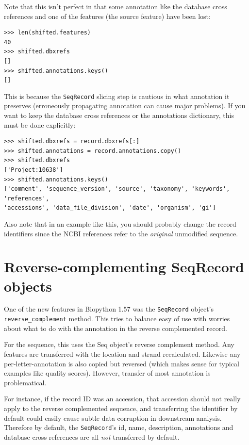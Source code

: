 \documentclass{report}
\begin{document}
Note that this isn't perfect in that some annotation like the database cross references
and one of the features (the source feature) have been lost:

\begin{verbatim}
>>> len(shifted.features)
40
>>> shifted.dbxrefs
[]
>>> shifted.annotations.keys()
[]
\end{verbatim}

This is because the \verb|SeqRecord| slicing step is cautious in what annotation
it preserves (erroneously propagating annotation can cause major problems). If
you want to keep the database cross references or the annotations dictionary,
this must be done explicitly:

\begin{verbatim}
>>> shifted.dbxrefs = record.dbxrefs[:]
>>> shifted.annotations = record.annotations.copy()
>>> shifted.dbxrefs
['Project:10638']
>>> shifted.annotations.keys()
['comment', 'sequence_version', 'source', 'taxonomy', 'keywords', 'references',
'accessions', 'data_file_division', 'date', 'organism', 'gi']
\end{verbatim}

Also note that in an example like this, you should probably change the record
identifiers since the NCBI references refer to the \emph{original} unmodified
sequence.

\section{Reverse-complementing SeqRecord objects}
\label{sec:SeqRecord-reverse-complement}

One of the new features in Biopython 1.57 was the \verb|SeqRecord| object's
\verb|reverse_complement| method. This tries to balance easy of use with worries
about what to do with the annotation in the reverse complemented record.

For the sequence, this uses the Seq object's reverse complement method. Any
features are transferred with the location and strand recalculated. Likewise
any per-letter-annotation is also copied but reversed (which makes sense for
typical examples like quality scores). However, transfer of most annotation
is problematical.

For instance, if the record ID was an accession, that accession should not really
apply to the reverse complemented sequence, and transferring the identifier by
default could easily cause subtle data corruption in downstream analysis.
Therefore by default, the \verb|SeqRecord|'s id, name, description, annotations
and database cross references are all \emph{not} transferred by default.
\end{document}
